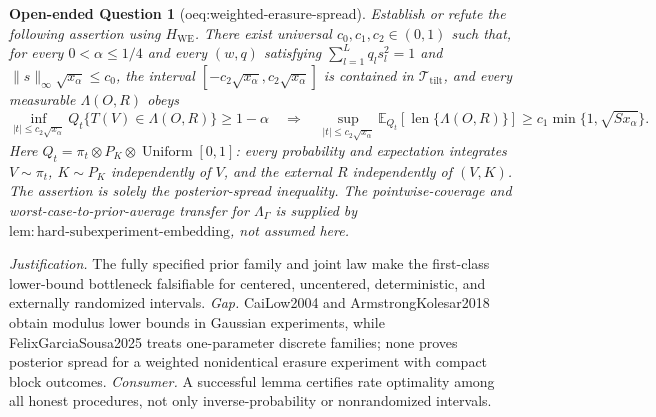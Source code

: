 \documentclass{article}
\newtheorem{openendedquestion}{Open-ended Question}
\begin{document}
\begin{openendedquestion}[oeq:weighted-erasure-spread]\label{oeq:weighted-erasure-spread}
Establish or refute the following assertion using \(H_{\mathrm{WE}}\). There exist universal \(c_0,c_1,c_2\in(0,1)\) such that, for every \(0<\alpha\le1/4\) and every \((w,q)\) satisfying \(\sum_{l=1}^Lq_ls_l^2=1\) and \(\|s\|_\infty\sqrt{x_\alpha}\le c_0\), the interval \([-c_2\sqrt{x_\alpha},c_2\sqrt{x_\alpha}]\) is contained in \(\mathcal T_{\mathrm{tilt}}\), and every measurable \(\Lambda(O,R)\) obeys \[\inf_{|t|\le c_2\sqrt{x_\alpha}}Q_t\{T(V)\in\Lambda(O,R)\}\ge1-\alpha\quad\Longrightarrow\quad\sup_{|t|\le c_2\sqrt{x_\alpha}}\mathbb E_{Q_t}[\operatorname{len}\{\Lambda(O,R)\}]\ge c_1\min\{1,\sqrt{Sx_\alpha}\}.\] Here \(Q_t=\pi_t\otimes P_K\otimes\operatorname{Uniform}[0,1]\): every probability and expectation integrates \(V\sim\pi_t\), \(K\sim P_K\) independently of \(V\), and the external \(R\) independently of \((V,K)\). The assertion is solely the posterior-spread inequality. The pointwise-coverage and worst-case-to-prior-average transfer for \(\Lambda_\Gamma\) is supplied by \(\mathrm{lem{:}hard\text{-}subexperiment\text{-}embedding}\), not assumed here.
\end{openendedquestion}
\par\smallskip\noindent \textit{Justification.} The fully specified prior family and joint law make the first-class lower-bound bottleneck falsifiable for centered, uncentered, deterministic, and externally randomized intervals. \textit{Gap.} CaiLow2004 and ArmstrongKolesar2018 obtain modulus lower bounds in Gaussian experiments, while FelixGarciaSousa2025 treats one-parameter discrete families; none proves posterior spread for a weighted nonidentical erasure experiment with compact block outcomes. \textit{Consumer.} A successful lemma certifies rate optimality among all honest procedures, not only inverse-probability or nonrandomized intervals.
\end{document}
